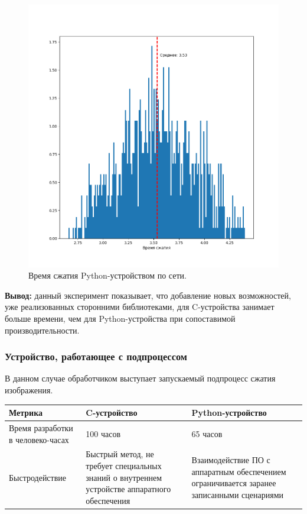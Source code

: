 \begin{figure}[!htbp]
    \centering
    \begin{adjustbox}{max totalsize={\textwidth}{\textheight}}
        \includegraphics{images/hist-lib-py-network.png}
    \end{adjustbox}
    \caption{Время сжатия Python-устройством по сети.}\label{fig:hist-lib-py-network}
\end{figure}

\textbf{Вывод:} данный эксперимент показывает, что добавление новых возможностей,
уже реализованных сторонними библиотеками, для C-устройства занимает больше времени,
чем для Python-устройства при сопоставимой производительности.

\subsubsection{Устройство, работающее с подпроцессом}\label{sec:ch3/sec2/sec2/sec2}

В данном случае обработчиком выступает запускаемый подпроцесс сжатия
изображения.

\begin{longtable}{| p{5cm} | p{5cm} | p{5cm} |}
    \hline
    Метрика & C-устройство & Python-устройство \\
    \hline
        Время разработки в человеко-часах &
        100 часов &
        65 часов \\
    \hline
        Быстродействие &
        Быстрый метод, не требует специальных знаний о внутреннем устройстве аппаратного обеспечения &
        Взаимодействие ПО с аппаратным обеспечением ограничивается заранее записанными сценариями \\
    \hline
\end{longtable}
